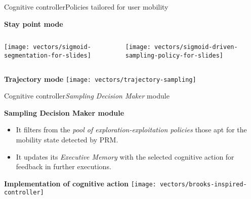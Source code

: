 \begin{frame}{Cognitive controller}{Policies tailored for user mobility}
\small
\vspace{-0.3cm}
\begin{block}{\small \textbf{Stay point mode}}
\begin{columns}
\begin{column}{0.45\textwidth}
{
  \centering
  \texttt{[image: vectors/sigmoid-segmentation-for-slides]}
}
\end{column}

\begin{column}{0.55\textwidth}
{
  \centering
  \texttt{[image: vectors/sigmoid-driven-sampling-policy-for-slides]}
}
\end{column}
\end{columns}
\end{block}

\begin{block}{\small \textbf{Trajectory mode}}
{
  \centering
  \texttt{[image: vectors/trajectory-sampling]}
}
\end{block}
\end{frame}


\begin{frame}{Cognitive controller}{\emph{Sampling Decision Maker} module}
\small
\vspace{-0.3cm}
\begin{block}{\small \textbf{Sampling Decision Maker module}}
  \begin{itemize}
      \item It filters from the \emph{pool of exploration-exploitation policies} those apt for the mobility state detected by PRM.
      \item It updates its \emph{Executive Memory} with the selected cognitive action for feedback in further executions.
  \end{itemize}
\end{block}

\begin{block}{\small \textbf{Implementation of cognitive action}}
{
  \centering
  \texttt{[image: vectors/brooks-inspired-controller]}
}
\end{block}
\end{frame}

